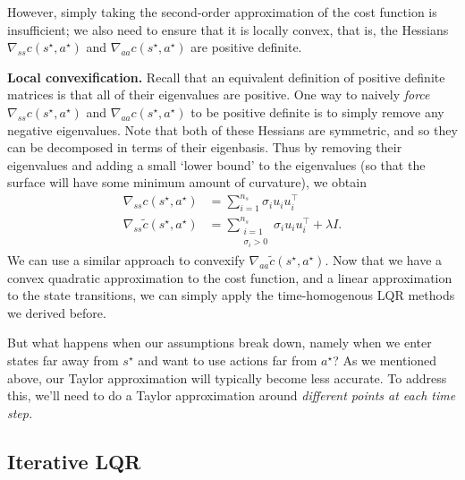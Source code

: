 \documentclass[../main/main]{subfiles}
\begin{document}
However, simply taking the second-order approximation of the cost function is insufficient;
we also need to ensure that it is locally convex, that is, the Hessians $\nabla_{ss} c(s^\star, a^\star)$ and $\nabla_{aa} c(s^\star, a^\star)$ are positive definite.

\textbf{Local convexification.} Recall that an equivalent definition of positive definite matrices is that all of their eigenvalues are positive. One way to naively \emph{force} $\nabla_{ss} c(s^\star, a^\star)$ and $\nabla_{aa} c(s^\star, a^\star)$ to be positive definite is to simply remove any negative eigenvalues.
Note that both of these Hessians are symmetric, and so they can be decomposed in terms of their eigenbasis. Thus by removing their eigenvalues and adding a small `lower bound' to the eigenvalues (so that the surface will have some minimum amount of curvature), we obtain
\begin{align*}
    \nabla_{ss} c(s^\star, a^\star) &= \sum_{i=1}^{n_s} \sigma_i u_i u_i^\top \\
    \nabla_{ss} \widetilde c(s^\star, a^\star) &= \sum_{\substack{i=1 \\ \sigma_i > 0}}^{n_s} \sigma_i u_i u_i^\top + \lambda I.
\end{align*}
We can use a similar approach to convexify $\nabla_{aa} \widetilde{c}(s^\star, a^\star).$ Now that we have a convex quadratic approximation to the cost function, and a linear approximation to the state transitions, we can simply apply the time-homogenous LQR methods we derived before.


But what happens when our assumptions break down, namely when we enter states far away from $s^\star$ and want to use actions far from $a^\star$?
As we mentioned above, our Taylor approximation will typically become less accurate.
To address this, we'll need to do a Taylor approximation around \emph{different points at each time step.}

\subsection{Iterative LQR}
\end{document}
